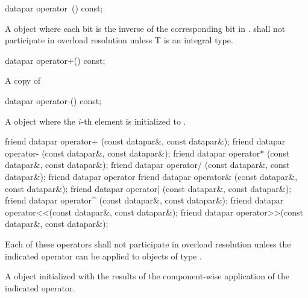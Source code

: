 \begin{itemdecl}
datapar operator~() const;
\end{itemdecl}
\begin{itemdescr}
  \pnum\returns A \datapar object where each bit is the inverse of the corresponding bit in .
  \pnum\remarks \datapar{} shall not participate in overload resolution unless \type T is an integral type.
\end{itemdescr}

\begin{itemdecl}
datapar operator+() const;
\end{itemdecl}
\begin{itemdescr}
  \pnum \returns A copy of 
\end{itemdescr}

\begin{itemdecl}
datapar operator-() const;
\end{itemdecl}
\begin{itemdescr}
  \pnum\returns A \datapar object where the $i$-th element is initialized to  \foralli.
\end{itemdescr}


\begin{itemdecl}
friend datapar operator+ (const datapar&, const datapar&);
friend datapar operator- (const datapar&, const datapar&);
friend datapar operator* (const datapar&, const datapar&);
friend datapar operator/ (const datapar&, const datapar&);
friend datapar operator%
friend datapar operator& (const datapar&, const datapar&);
friend datapar operator| (const datapar&, const datapar&);
friend datapar operator^ (const datapar&, const datapar&);
friend datapar operator<<(const datapar&, const datapar&);
friend datapar operator>>(const datapar&, const datapar&);
\end{itemdecl}
\begin{itemdescr}
  \pnum\remarks Each of these operators shall not participate in overload resolution unless the indicated operator can be applied to objects of type .

  \pnum\returns A \datapar object initialized with the results of the component-wise application of the indicated operator.
\end{itemdescr}

